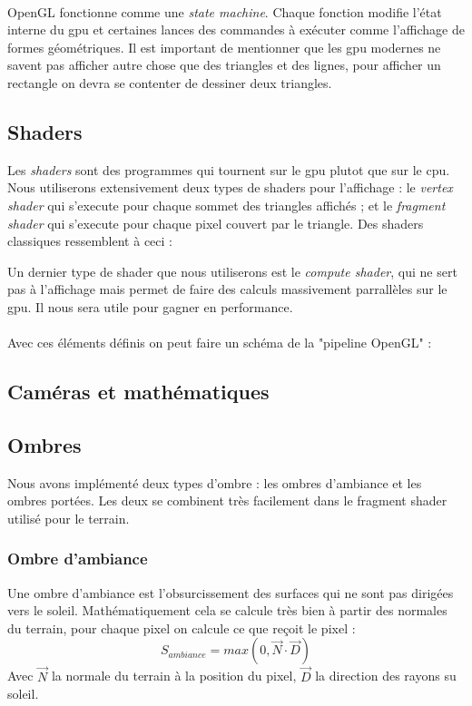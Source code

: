 \documentclass[11pt]{article} %
\begin{document}
\paragraph{}
OpenGL fonctionne comme une \textit{state machine}. Chaque fonction modifie l'état interne du gpu et certaines lances des commandes à exécuter comme l'affichage de formes géométriques.
Il est important de mentionner que les gpu modernes ne savent pas afficher autre chose que des triangles et des lignes, pour afficher un rectangle on devra se contenter de dessiner deux triangles.

\subsection{Shaders}

Les \textit{shaders} sont des programmes qui tournent sur le gpu plutot que sur le cpu. Nous utiliserons extensivement deux types de shaders pour l'affichage : le \textit{vertex shader} qui s'execute pour chaque sommet des triangles affichés ; et le \textit{fragment shader} qui s'execute pour chaque pixel couvert par le triangle. Des shaders classiques ressemblent à ceci :

Un dernier type de shader que nous utiliserons est le \textit{compute shader}, qui ne sert pas à l'affichage mais permet de faire des calculs massivement parrallèles sur le gpu. Il nous sera utile pour gagner en performance.

\paragraph{}
Avec ces éléments définis on peut faire un schéma de la "pipeline OpenGL" :


\subsection{Caméras et mathématiques}

\subsection{Ombres}

Nous avons implémenté deux types d'ombre : les ombres d'ambiance et les ombres portées. Les deux se combinent très facilement dans le fragment shader utilisé pour le terrain.
\subsubsection{Ombre d'ambiance}
Une ombre d'ambiance est l'obsurcissement des surfaces qui ne sont pas dirigées vers le soleil. Mathématiquement cela se calcule très bien à partir des normales du terrain, pour chaque pixel on calcule ce que reçoit le pixel :
$$ S_{ambiance}=max(0, \vec{N}\cdot \vec{D}) $$
Avec $\vec{N}$ la normale du terrain à la position du pixel, $\vec{D}$ la direction des rayons su soleil.
\end{document}
